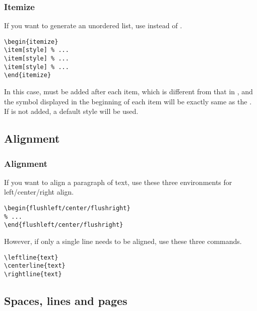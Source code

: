 \begin{frame}[fragile]
    \frametitle{Itemize}
    If you want to generate an unordered list, use  instead of .
    \begin{command}
        \begin{verbatim}
\begin{itemize}
\item[style] % ...
\item[style] % ...
\item[style] % ...
\end{itemize}
		\end{verbatim}
    \end{command}
    \pause
    In this case,  must be added after each item, which is different from that in , and the symbol displayed in the beginning of each item will be exactly same as the . If  is not added, a default style will be used.
\end{frame}

\subsection{Alignment}

\begin{frame}[fragile]
    \frametitle{Alignment}
    If you want to align a paragraph of text, use these three environments for left/center/right align.
    \begin{command}
        \begin{verbatim}
\begin{flushleft/center/flushright}
% ...
\end{flushleft/center/flushright}
			\end{verbatim}
    \end{command}
    \pause
    However, if only a single line needs to be aligned, use these three commands.
    \begin{command}
        \begin{verbatim}
\leftline{text}
\centerline{text}
\rightline{text}
		\end{verbatim}
    \end{command}
\end{frame}

\subsection{Spaces, lines and pages}

